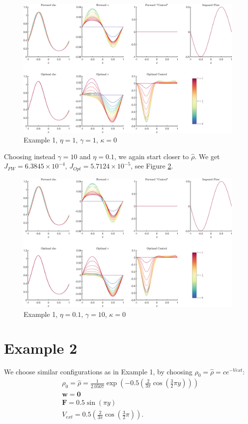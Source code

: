 \documentclass[11pt, a4paper]{article}
\theoremstyle{definition}
\newcommand{\w}{\mathbf{w}}
\begin{document}
	\begin{figure}[h]
		\centering
		\includegraphics[scale=0.04]{Example1a.png}
		\caption{Example 1, $\eta = 1$, $\gamma = 1$, $\kappa = 0$} 
		\label{F2}
	\end{figure}
	Choosing instead $\gamma = 10$ and $\eta = 0.1$, we again start closer to $\widehat \rho$. We get $J_{FW} = 6.3845 \times 10^{-4}$, $J_{Opt} = 5.7124 \times 10^{-5}$, see Figure \ref{F3}.
	\begin{figure}[h]
		\centering
		\includegraphics[scale=0.04]{Example1b.png}
		\caption{Example 1, $\eta = 0.1$, $\gamma = 10$, $\kappa = 0$} 
		\label{F3}
	\end{figure}
	
	\section*{Example 2}
	We choose similar configurations as in Example 1, by choosing $\rho_0 = \widehat \rho = c e^{-V{ext}}$:
	\begin{align*}
	&\rho_0 = \widehat \rho = \frac{1}{2.0507} \exp\left(-0.5\left(\frac{2}{3 \pi}\cos\left(\frac{3}{2}\pi y\right)\right) \right)\\
	&\w = \mathbf 0 \\
	&\mathbf{F} = 0.5 \sin(\pi y)\\
	&V_{ext} = 0.5 \left(\frac{2}{3 \pi}\cos\left(\frac{3}{2}\pi \right) \right).
	\end{align*}
	
\end{document}
